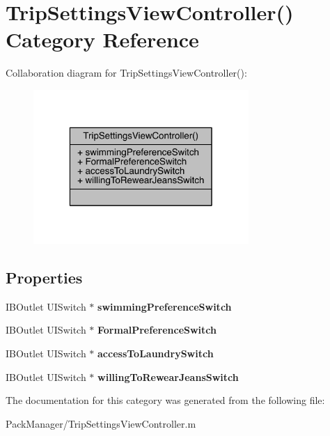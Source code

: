 \hypertarget{category_trip_settings_view_controller_07_08}{\section{Trip\-Settings\-View\-Controller() Category Reference}
\label{category_trip_settings_view_controller_07_08}
}


Collaboration diagram for Trip\-Settings\-View\-Controller()\-:\nopagebreak
\begin{figure}[H]
\begin{center}
\leavevmode
\includegraphics[width=232pt]{category_trip_settings_view_controller_07_08__coll__graph}
\end{center}
\end{figure}
\subsection*{Properties}
\begin{DoxyCompactItemize}
\item 
\hypertarget{category_trip_settings_view_controller_07_08_a0091d8b25790992c35e1d88f6beb031c}{I\-B\-Outlet U\-I\-Switch $\ast$ {\bfseries swimming\-Preference\-Switch}}\label{category_trip_settings_view_controller_07_08_a0091d8b25790992c35e1d88f6beb031c}

\item 
\hypertarget{category_trip_settings_view_controller_07_08_abc0f3340c3629048743e0aeafda0f2e5}{I\-B\-Outlet U\-I\-Switch $\ast$ {\bfseries Formal\-Preference\-Switch}}\label{category_trip_settings_view_controller_07_08_abc0f3340c3629048743e0aeafda0f2e5}

\item 
\hypertarget{category_trip_settings_view_controller_07_08_ab0e4b134ad9a8294f39f2294bb305146}{I\-B\-Outlet U\-I\-Switch $\ast$ {\bfseries access\-To\-Laundry\-Switch}}\label{category_trip_settings_view_controller_07_08_ab0e4b134ad9a8294f39f2294bb305146}

\item 
\hypertarget{category_trip_settings_view_controller_07_08_ac88d678fdc5ce5bcdbcd1755620ce028}{I\-B\-Outlet U\-I\-Switch $\ast$ {\bfseries willing\-To\-Rewear\-Jeans\-Switch}}\label{category_trip_settings_view_controller_07_08_ac88d678fdc5ce5bcdbcd1755620ce028}

\end{DoxyCompactItemize}


The documentation for this category was generated from the following file\-:\begin{DoxyCompactItemize}
\item 
Pack\-Manager/Trip\-Settings\-View\-Controller.\-m\end{DoxyCompactItemize}
